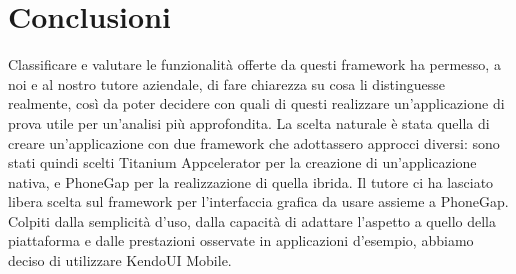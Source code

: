 	\section{Conclusioni}
		Classificare e valutare le funzionalità offerte da questi framework 
		ha permesso, a noi e al nostro tutore aziendale, di fare chiarezza su cosa 
		li distinguesse realmente, così 
		da poter decidere con quali di questi realizzare un'applicazione di prova utile 
		per un'analisi più approfondita.
		La scelta naturale è stata quella di creare un'applicazione con due 
		framework che adottassero approcci diversi: sono stati quindi scelti 
		Titanium Appcelerator per la creazione di un'applicazione nativa, e 
		PhoneGap per la realizzazione di quella ibrida.
		Il tutore ci ha lasciato libera scelta sul framework per l'interfaccia 
		grafica da usare assieme a PhoneGap. Colpiti dalla semplicità d'uso, 
		dalla capacità di adattare l'aspetto a quello della piattaforma e 
		dalle prestazioni osservate in applicazioni d'esempio, abbiamo deciso 
		di utilizzare KendoUI Mobile.
		
